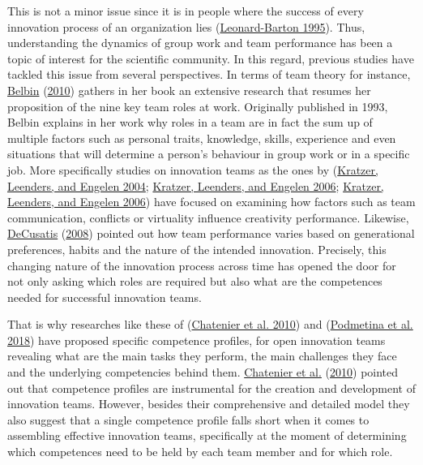 \documentclass[AMA,STIX1COL,APA,STIX2COL]{WileyNJD-v2}
\begin{document}
This is not a minor issue since it is in people where the success of
every innovation process of an organization lies
(\protect\hyperlink{ref-Leonard1995}{Leonard-Barton 1995}). Thus,
understanding the dynamics of group work and team performance has been a
topic of interest for the scientific community. In this regard, previous
studies have tackled this issue from several perspectives. In terms of
team theory for instance, \protect\hyperlink{ref-Belbin2010}{Belbin}
(\protect\hyperlink{ref-Belbin2010}{2010}) gathers in her book an
extensive research that resumes her proposition of the nine key team
roles at work. Originally published in 1993, Belbin explains in her work
why roles in a team are in fact the sum up of multiple factors such as
personal traits, knowledge, skills, experience and even situations that
will determine a person's behaviour in group work or in a specific job.
More specifically studies on innovation teams as the ones by
(\protect\hyperlink{ref-Kratzer2004}{Kratzer, Leenders, and Engelen
2004}; \protect\hyperlink{ref-Kratzer2006-A}{Kratzer, Leenders, and
Engelen 2006}; \protect\hyperlink{ref-Kratzer2006-B}{Kratzer, Leenders,
and Engelen 2006}) have focused on examining how factors such as team
communication, conflicts or virtuality influence creativity performance.
Likewise, \protect\hyperlink{ref-DeCusatis2008}{DeCusatis}
(\protect\hyperlink{ref-DeCusatis2008}{2008}) pointed out how team
performance varies based on generational preferences, habits and the
nature of the intended innovation. Precisely, this changing nature of
the innovation process across time has opened the door for not only
asking which roles are required but also what are the competences needed
for successful innovation teams.

That is why researches like these of
(\protect\hyperlink{ref-Chatenier2010}{Chatenier et al. 2010}) and
(\protect\hyperlink{ref-Podmetina2018}{Podmetina et al. 2018}) have
proposed specific competence profiles, for open innovation teams
revealing what are the main tasks they perform, the main challenges they
face and the underlying competencies behind them.
\protect\hyperlink{ref-Chatenier2010}{Chatenier et al.}
(\protect\hyperlink{ref-Chatenier2010}{2010}) pointed out that
competence profiles are instrumental for the creation and development of
innovation teams. However, besides their comprehensive and detailed
model they also suggest that a single competence profile falls short
when it comes to assembling effective innovation teams, specifically at
the moment of determining which competences need to be held by each team
member and for which role.
\end{document}
